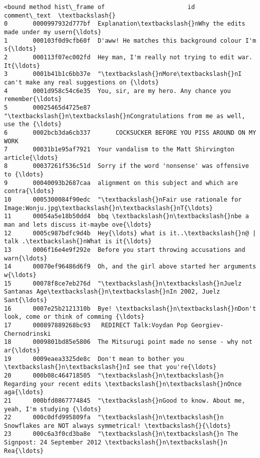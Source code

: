 \documentclass[11pt]{article}
\begin{document}
    \begin{Verbatim}[commandchars=\\\{\}]
<bound method hist\_frame of                       id                                       comment\_text  \textbackslash{}
0       0000997932d777bf  Explanation\textbackslash{}nWhy the edits made under my usern{\ldots}   
1       000103f0d9cfb60f  D'aww! He matches this background colour I'm s{\ldots}   
2       000113f07ec002fd  Hey man, I'm really not trying to edit war. It{\ldots}   
3       0001b41b1c6bb37e  "\textbackslash{}nMore\textbackslash{}nI can't make any real suggestions on {\ldots}   
4       0001d958c54c6e35  You, sir, are my hero. Any chance you remember{\ldots}   
5       00025465d4725e87  "\textbackslash{}n\textbackslash{}nCongratulations from me as well, use the {\ldots}   
6       0002bcb3da6cb337       COCKSUCKER BEFORE YOU PISS AROUND ON MY WORK   
7       00031b1e95af7921  Your vandalism to the Matt Shirvington article{\ldots}   
8       00037261f536c51d  Sorry if the word 'nonsense' was offensive to {\ldots}   
9       00040093b2687caa  alignment on this subject and which are contra{\ldots}   
10      0005300084f90edc  "\textbackslash{}nFair use rationale for Image:Wonju.jpg\textbackslash{}n\textbackslash{}nT{\ldots}   
11      00054a5e18b50dd4  bbq \textbackslash{}n\textbackslash{}nbe a man and lets discuss it-maybe ove{\ldots}   
12      0005c987bdfc9d4b  Hey{\ldots} what is it..\textbackslash{}n@ | talk .\textbackslash{}nWhat is it{\ldots}   
13      0006f16e4e9f292e  Before you start throwing accusations and warn{\ldots}   
14      00070ef96486d6f9  Oh, and the girl above started her arguments w{\ldots}   
15      00078f8ce7eb276d  "\textbackslash{}n\textbackslash{}nJuelz Santanas Age\textbackslash{}n\textbackslash{}nIn 2002, Juelz Sant{\ldots}   
16      0007e25b2121310b  Bye! \textbackslash{}n\textbackslash{}nDon't look, come or think of comming {\ldots}   
17      000897889268bc93   REDIRECT Talk:Voydan Pop Georgiev- Chernodrinski   
18      0009801bd85e5806  The Mitsurugi point made no sense - why not ar{\ldots}   
19      0009eaea3325de8c  Don't mean to bother you \textbackslash{}n\textbackslash{}nI see that you're{\ldots}   
20      000b08c464718505  "\textbackslash{}n\textbackslash{}n Regarding your recent edits \textbackslash{}n\textbackslash{}nOnce aga{\ldots}   
21      000bfd0867774845  "\textbackslash{}nGood to know. About me, yeah, I'm studying {\ldots}   
22      000c0dfd995809fa  "\textbackslash{}n\textbackslash{}n Snowflakes are NOT always symmetrical! \textbackslash{}{\ldots}   
23      000c6a3f0cd3ba8e  "\textbackslash{}n\textbackslash{}n The Signpost: 24 September 2012 \textbackslash{}n\textbackslash{}n Rea{\ldots}   

\end{Verbatim}
\end{document}
